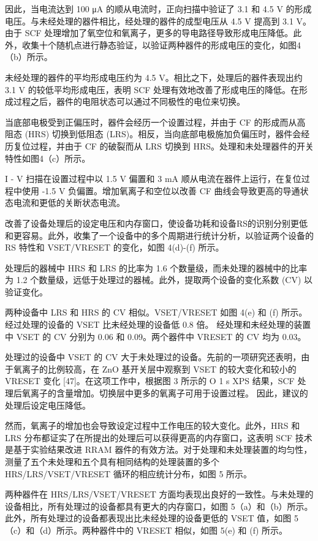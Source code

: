 因此，当电流达到 100 μA 的顺从电流时，正向扫描中验证了 3.1 和 4.5 V 的形成电压。与未经处理的器件相比，经处理的器件的成型电压从 4.5 V 提高到 3.1 V。由于 SCF 处理增加了氧空位和氧离子，更多的导电路径导致形成电压降低。此外，收集十个随机点进行静态验证，以验证两种器件的形成电压的变化，如图4（b）所示。

未经处理的器件的平均形成电压约为 4.5 V。相比之下，处理后的器件表现出约 3.1 V 的较低平均形成电压，表明 SCF 处理有效地改善了形成电压的降低。在形成过程之后，器件的电阻状态可以通过不同极性的电位来切换。

当底部电极受到正偏压时，器件会经历一个设置过程，并由于 CF 的形成而从高阻态 (HRS) 切换到低阻态 (LRS)。相反，当向底部电极施加负偏压时，器件会经历复位过程，并由于 CF 的破裂而从 LRS 切换到 HRS。处理和未处理器件的开关特性如图4（c）所示。

I - V 扫描在设置过程中以 1.5 V 偏置和 3 mA 顺从电流在器件上运行，在复位过程中使用 -1.5 V 负偏置。增加氧离子和空位以改善 CF 曲线会导致更高的导通状态电流和更低的关断状态电流。

改善了设备处理后的设定电压和内存窗口，使设备功耗和设备RS的识别分别更低和更容易。此外，收集了一个设备中的多个周期进行统计分析，以验证两个设备的 RS 特性和 VSET/VRESET 的变化，如图 4(d)-(f) 所示。

处理后的器械中 HRS 和 LRS 的比率为 1.6 个数量级，而未处理的器械中的比率为 1.2 个数量级，远低于处理过的器械。此外，提取两个设备的变化系数 (CV) 以验证变化。

两种设备中 LRS 和 HRS 的 CV 相似。VSET/VRESET 如图 4(e) 和 (f) 所示。经过处理的设备的 VSET 比未经处理的设备低 0.8 倍。
经处理和未经处理的装置中 VSET 的 CV 分别为 0.06 和 0.09。两个器件中 VRESET 的 CV 均为 0.03。

处理过的设备中 VSET 的 CV 大于未处理过的设备。先前的一项研究还表明，由于氧离子的比例较高，在 ZnO 基开关层中观察到 VSET 的较大变化和较小的 VRESET 变化 [47]。在这项工作中，根据图 3 所示的 O 1 s XPS 结果，SCF 处理后氧离子的含量增加。切换层中更多的氧离子可用于设置过程。
因此，建议的处理后设定电压降低。

然而，氧离子的增加也会导致设定过程中工作电压的较大变化。此外，HRS 和 LRS 分布都证实了在所提出的处理后可以获得更高的内存窗口，这表明 SCF 技术是基于实验结果改进 RRAM 器件的有效方法。对于处理和未处理装置的均匀性，测量了五个未处理和五个具有相同结构的处理装置的多个 HRS/LRS/VSET/VRESET 循环的相应统计分布，如图 5 所示。

两种器件在 HRS/LRS/VSET/VRESET 方面均表现出良好的一致性。与未处理的设备相比，所有处理过的设备都具有更大的内存窗口，如图 5（a）和（b）所示。此外，所有处理过的设备都表现出比未经处理的设备更低的 VSET 值，如图 5（c）和（d）所示。两种器件中的 VRESET 相似，如图 5(e) 和 (f) 所示。

